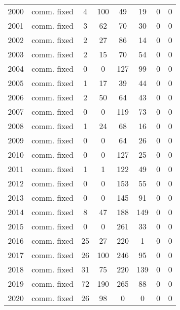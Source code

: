 \begin{longtable}[t]{c>{\centering\arraybackslash}p{2cm}cccccc}
2000 & comm. fixed & 4 & 100 & 49 & 19 & 0 & 0\\
2001 & comm. fixed & 3 & 62 & 70 & 30 & 0 & 0\\
2002 & comm. fixed & 2 & 27 & 86 & 14 & 0 & 0\\
2003 & comm. fixed & 2 & 15 & 70 & 54 & 0 & 0\\
2004 & comm. fixed & 0 & 0 & 127 & 99 & 0 & 0\\
2005 & comm. fixed & 1 & 17 & 39 & 44 & 0 & 0\\
2006 & comm. fixed & 2 & 50 & 64 & 43 & 0 & 0\\
2007 & comm. fixed & 0 & 0 & 119 & 73 & 0 & 0\\
2008 & comm. fixed & 1 & 24 & 68 & 16 & 0 & 0\\
2009 & comm. fixed & 0 & 0 & 64 & 26 & 0 & 0\\
2010 & comm. fixed & 0 & 0 & 127 & 25 & 0 & 0\\
2011 & comm. fixed & 1 & 1 & 122 & 49 & 0 & 0\\
2012 & comm. fixed & 0 & 0 & 153 & 55 & 0 & 0\\
2013 & comm. fixed & 0 & 0 & 145 & 91 & 0 & 0\\
2014 & comm. fixed & 8 & 47 & 188 & 149 & 0 & 0\\
2015 & comm. fixed & 0 & 0 & 261 & 33 & 0 & 0\\
2016 & comm. fixed & 25 & 27 & 220 & 1 & 0 & 0\\
2017 & comm. fixed & 26 & 100 & 246 & 95 & 0 & 0\\
2018 & comm. fixed & 31 & 75 & 220 & 139 & 0 & 0\\
2019 & comm. fixed & 72 & 190 & 265 & 88 & 0 & 0\\
2020 & comm. fixed & 26 & 98 & 0 & 0 & 0 & 0\\*
\end{longtable}
\endgroup{}
\endgroup{}
